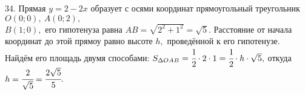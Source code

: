34. Прямая $y=2-2x$ образует с осями координат прямоугольный треугольник $O(0;0),\ A(0;2),$\\$ B(1;0),$ его гипотенуза равна $AB=\sqrt{2^2+1^2}=\sqrt{5}.$ Расстояние от начала координат до этой прямоу равно высоте $h,$ проведённой к его гипотенузе. Найдём его площадь двумя способами: $S_{\Delta OAB}=\cfrac{1}{2}\cdot2\cdot1=\cfrac{1}{2}\cdot h\cdot\sqrt{5},$ откуда $h=\cfrac{2}{\sqrt{5}}=\cfrac{2\sqrt{5}}{5}.$\\

